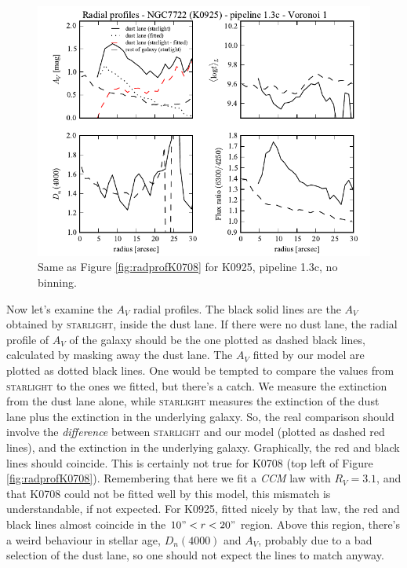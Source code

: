 \documentclass[a4paper]{article}
\def\starlight{\textsc{starlight}\xspace}
\def\CCM{\textit{CCM}\xspace}
\begin{document}
\begin{figure}
\includegraphics{figures/radprof_K0925_1.3c_v01.pdf}

\caption{Same as Figure \ref{fig:radprofK0708} for K0925, pipeline 1.3c, no
binning.}
\label{fig:radprofK0925}
\end{figure}

Now let's examine the $A_V$ radial profiles. The black solid lines are the $A_V$
obtained by \starlight, inside the dust lane. If there were no dust lane, the
radial profile of $A_V$ of the galaxy should be the one plotted as dashed black
lines, calculated by masking away the dust lane. The $A_V$ fitted by our model
are plotted as dotted black lines. One would be tempted to compare the values
from \starlight to the ones we fitted, but there's a catch. We measure the
extinction from the dust lane alone, while \starlight measures the extinction of
the dust lane plus the extinction in the underlying galaxy. So, the real
comparison should involve the {\em difference} between \starlight and our model
(plotted as dashed red lines), and the extinction in the underlying galaxy.
Graphically, the red and black lines should coincide. This is certainly not true
for K0708 (top left of Figure \ref{fig:radprofK0708}). Remembering that here we
fit a \CCM law with $R_V = 3.1$, and that K0708 could not be fitted well by this
model, this mismatch is understandable, if not expected. For K0925, fitted
nicely by that law, the red and black lines almost coincide in the $10" < r <
20"$ region. Above this region, there's a weird behaviour in stellar age,
$D_n(4000)$ and $A_V$, probably due to a bad selection of the dust lane, so one
should not expect the lines to match anyway.
\end{document}

